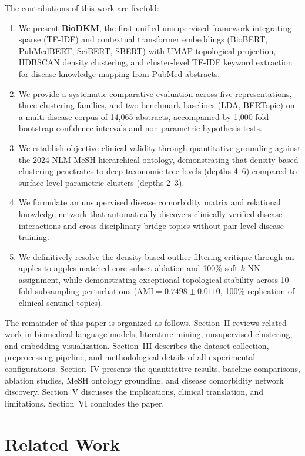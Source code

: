 \documentclass[a4paper,10pt,conference]{IEEEtran}
\begin{document}
The contributions of this work are fivefold:
\begin{enumerate}
\item We present \textbf{BioDKM}, the first unified unsupervised framework integrating sparse (TF-IDF) and contextual transformer embeddings (BioBERT, PubMedBERT, SciBERT, SBERT) with UMAP topological projection, HDBSCAN density clustering, and cluster-level TF-IDF keyword extraction for disease knowledge mapping from PubMed abstracts.
\item We provide a systematic comparative evaluation across five representations, three clustering families, and two benchmark baselines (LDA, BERTopic) on a multi-disease corpus of 14,065 abstracts, accompanied by 1,000-fold bootstrap confidence intervals and non-parametric hypothesis tests.
\item We establish objective clinical validity through quantitative grounding against the 2024 NLM MeSH hierarchical ontology, demonstrating that density-based clustering penetrates to deep taxonomic tree levels (depths 4--6) compared to surface-level parametric clusters (depths 2--3).
\item We formulate an unsupervised disease comorbidity matrix and relational knowledge network that automatically discovers clinically verified disease interactions and cross-disciplinary bridge topics without pair-level disease training.
\item We definitively resolve the density-based outlier filtering critique through an apples-to-apples matched core subset ablation and 100\% soft $k$-NN assignment, while demonstrating exceptional topological stability across 10-fold subsampling perturbations ($\text{AMI} = 0.7498 \pm 0.0110$, 100\% replication of clinical sentinel topics).
\end{enumerate}

The remainder of this paper is organized as follows. Section~II reviews related work in biomedical language models, literature mining, unsupervised clustering, and embedding visualization. Section~III describes the dataset collection, preprocessing pipeline, and methodological details of all experimental configurations. Section~IV presents the quantitative results, baseline comparisons, ablation studies, MeSH ontology grounding, and disease comorbidity network discovery. Section~V discusses the implications, clinical translation, and limitations. Section~VI concludes the paper.

\section{Related Work}
\end{document}
